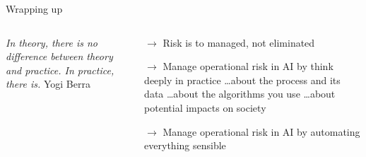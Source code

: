 \begin{frame}{Wrapping up}
\begin{columns}[T]
\begin{column}{.40\textwidth}
\begin{figure}[ht]
            \end{figure}
            \emph{In theory, there is no difference between theory and practice. \newline
            In practice, there is.}\newline
            Yogi Berra
        \end{column}
        \begin{column}{0.56\textwidth}%
                \begin{block}{$\rightarrow$ Risk is to managed, not eliminated}
            \end{block}
            \begin{block}{$\rightarrow$ Manage operational risk in AI by think deeply in practice}
                \ldots about the process and its data
                \newline
                \ldots about the algorithms you use
                \newline
                \ldots about potential impacts on society
            \end{block}
            \begin{block}{$\rightarrow$ Manage operational risk in AI by automating everything sensible}
            \end{block}
        \end{column}
    \end{columns}
\end{frame}

